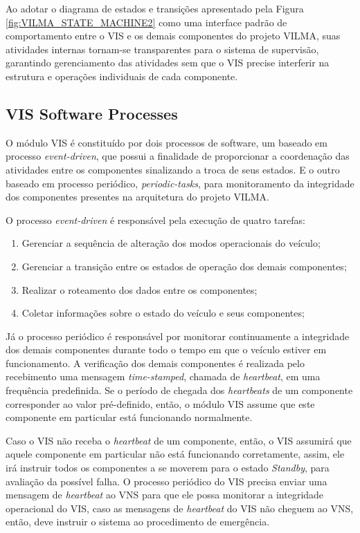 \documentclass[conference]{IEEEtran}
\begin{document}
Ao adotar o diagrama de estados e transições apresentado pela Figura \ref{fig:VILMA_STATE_MACHINE2} como uma interface padrão de comportamento entre o VIS e os demais componentes do projeto VILMA, suas atividades internas tornam-se transparentes para o sistema de supervisão, garantindo gerenciamento das atividades sem que o VIS precise interferir na estrutura e operações individuais de cada componente.

%
%
\subsection{VIS Software Processes}\label{subsec:vis_software_processes}

O módulo VIS é constituído por dois processos de software, um baseado em processo \textit{event-driven}, que possui a finalidade de proporcionar a coordenação das atividades entre os componentes sinalizando a troca de seus estados. E o outro baseado em processo periódico, \textit{periodic-tasks}, para monitoramento da integridade dos componentes presentes na arquitetura do projeto VILMA.

O processo \textit{event-driven} é responsável pela execução de quatro tarefas: 
\begin{enumerate}
	\item Gerenciar a sequência de alteração dos modos operacionais do veículo;
	\item Gerenciar a transição entre os estados de operação dos demais componentes;
	\item Realizar o roteamento dos dados entre os componentes;
	\item Coletar informações sobre o estado do veículo e seus componentes;
\end{enumerate}

Já o processo periódico é responsável por monitorar continuamente a integridade dos demais componentes durante todo o tempo em que o veículo estiver em funcionamento. A verificação dos demais componentes é realizada pelo recebimento uma mensagem \textit{time-stamped}, chamada de \textit{heartbeat}, em uma frequência predefinida. Se o período de chegada dos \textit{heartbeats} de um componente corresponder ao valor pré-definido, então, o módulo VIS assume que este componente em particular está funcionando normalmente.

Caso o VIS não receba o \textit{heartbeat} de um componente, então, o VIS assumirá que aquele componente em particular não está funcionando corretamente, assim, ele irá instruir todos os componentes a se moverem para o estado \textit{Standby}, para avaliação da possível falha. O processo periódico do VIS precisa enviar uma mensagem de \textit{heartbeat} ao VNS para que ele possa monitorar a integridade operacional do VIS, caso as mensagens de \textit{heartbeat} do VIS não cheguem ao VNS, então, deve instruir o sistema ao procedimento de emergência.
\end{document}
